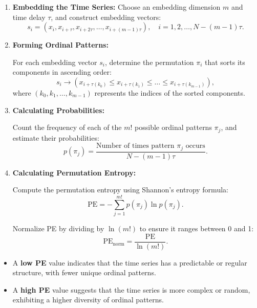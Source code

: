 \begin{enumerate} \item \textbf{Embedding the Time Series:}
Choose an embedding dimension $m$ and time delay $\tau$, and construct embedding vectors:
\begin{equation}
    s_i = \left( x_i, x_{i+\tau}, x_{i+2\tau}, \dots, x_{i+(m-1)\tau} \right), \quad i = 1,2,\dots, N - (m -1)\tau.
\end{equation}

\item \textbf{Forming Ordinal Patterns:}

For each embedding vector $s_i$, determine the permutation $\pi_i$ that sorts its components in ascending order:
\begin{equation}
    s_i \rightarrow \left( x_{i+\tau(k_0)} \leq x_{i+\tau(k_1)} \leq \dots \leq x_{i+\tau(k_{m-1})} \right),
\end{equation}
where $(k_0, k_1, \dots, k_{m-1})$ represents the indices of the sorted components.

\item \textbf{Calculating Probabilities:}

Count the frequency of each of the $m!$ possible ordinal patterns $\pi_j$, and estimate their probabilities:
\begin{equation}
    p(\pi_j) = \frac{\text{Number of times pattern } \pi_j \text{ occurs}}{N - (m -1)\tau}.
\end{equation}

\item \textbf{Calculating Permutation Entropy:}

Compute the permutation entropy using Shannon's entropy formula:
\begin{equation}
    \mathrm{PE} = - \sum_{j=1}^{m!} p(\pi_j) \ln p(\pi_j).
\end{equation}

Normalize \ac{PE} by dividing by $\ln(m!)$ to ensure it ranges between 0 and 1:
\begin{equation}
    \mathrm{PE}_{\text{norm}} = \frac{\mathrm{PE}}{\ln(m!)}.
\end{equation}
\end{enumerate}

\begin{itemize} \item A \textbf{low PE} value indicates that the time series has a predictable or regular structure, with fewer unique ordinal patterns. \item A \textbf{high PE} value suggests that the time series is more complex or random, exhibiting a higher diversity of ordinal patterns. \end{itemize}



